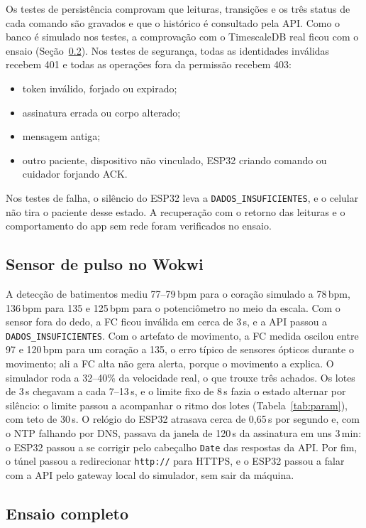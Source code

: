 \documentclass[12pt,a4paper]{article}
\begin{document}
Os testes de persistência comprovam que leituras, transições e os três status de cada comando são gravados e que o histórico é consultado pela API.
Como o banco é simulado nos testes, a comprovação com o TimescaleDB real ficou com o ensaio (Seção~\ref{sec:ensaio}).
Nos testes de segurança, todas as identidades inválidas recebem 401 e todas as operações fora da permissão recebem 403:
\begin{itemize}
  \item token inválido, forjado ou expirado;
  \item assinatura errada ou corpo alterado;
  \item mensagem antiga;
  \item outro paciente, dispositivo não vinculado, ESP32 criando comando ou cuidador forjando ACK.
\end{itemize}
Nos testes de falha, o silêncio do ESP32 leva a \texttt{DADOS\_INSUFICIENTES}, e o celular não tira o paciente desse estado.
A recuperação com o retorno das leituras e o comportamento do app sem rede foram verificados no ensaio.

\subsection{Sensor de pulso no Wokwi}

A detecção de batimentos mediu 77--79\,bpm para o coração simulado a 78\,bpm, 136\,bpm para 135 e 125\,bpm para o potenciômetro no meio da escala.
Com o sensor fora do dedo, a FC ficou inválida em cerca de 3\,s, e a API passou a \texttt{DADOS\_INSUFICIENTES}.
Com o artefato de movimento, a FC medida oscilou entre 97 e 120\,bpm para um coração a 135, o erro típico de sensores ópticos durante o movimento; ali a FC alta não gera alerta, porque o movimento a explica.
O simulador roda a 32--40\% da velocidade real, o que trouxe três achados.
Os lotes de 3\,s chegavam a cada 7--13\,s, e o limite fixo de 8\,s fazia o estado alternar por silêncio: o limite passou a acompanhar o ritmo dos lotes (Tabela~\ref{tab:param}), com teto de 30\,s.
O relógio do ESP32 atrasava cerca de 0,65\,s por segundo e, com o NTP falhando por DNS, passava da janela de 120\,s da assinatura em uns 3\,min: o ESP32 passou a se corrigir pelo cabeçalho \texttt{Date} das respostas da API.
Por fim, o túnel passou a redirecionar \texttt{http://} para HTTPS, e o ESP32 passou a falar com a API pelo gateway local do simulador, sem sair da máquina.

\subsection{Ensaio completo}\label{sec:ensaio}
\end{document}
